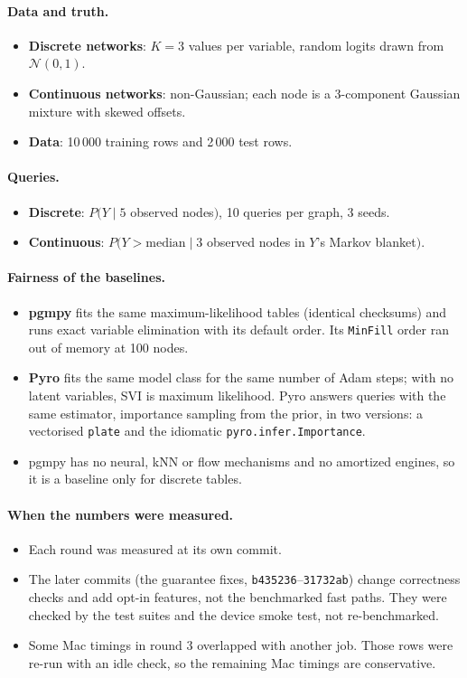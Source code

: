 \documentclass[10pt,a4paper]{article}
\newcommand{\code}[1]{\texttt{#1}}
\begin{document}
\paragraph{Data and truth.}
\begin{itemize}
\item \textbf{Discrete networks}: $K=3$ values per variable, random logits drawn from $\mathcal N(0,1)$.
\item \textbf{Continuous networks}: non-Gaussian; each node is a 3-component Gaussian mixture with skewed offsets.
\item \textbf{Data}: 10\,000 training rows and 2\,000 test rows.
\end{itemize}

\paragraph{Queries.}
\begin{itemize}
\item \textbf{Discrete}: $P(Y\mid 5$ observed nodes$)$, 10 queries per graph, 3 seeds.
\item \textbf{Continuous}: $P(Y>\text{median}\mid 3$ observed nodes in $Y$'s Markov blanket$)$.
\end{itemize}

\paragraph{Fairness of the baselines.}
\begin{itemize}
\item \textbf{pgmpy} fits the same maximum-likelihood tables (identical checksums) and runs exact variable elimination with its default order. Its \code{MinFill} order ran out of memory at 100 nodes.
\item \textbf{Pyro} fits the same model class for the same number of Adam steps; with no latent variables, SVI is maximum likelihood. Pyro answers queries with the same estimator, importance sampling from the prior, in two versions: a vectorised \code{plate} and the idiomatic \code{pyro.infer.Importance}.
\item pgmpy has no neural, kNN or flow mechanisms and no amortized engines, so it is a baseline only for discrete tables.
\end{itemize}

\paragraph{When the numbers were measured.}
\begin{itemize}
\item Each round was measured at its own commit.
\item The later commits (the guarantee fixes, \code{b435236}--\code{31732ab}) change correctness checks and add opt-in features, not the benchmarked fast paths. They were checked by the test suites and the device smoke test, not re-benchmarked.
\item Some Mac timings in round 3 overlapped with another job. Those rows were re-run with an idle check, so the remaining Mac timings are conservative.
\end{itemize}
\end{document}
